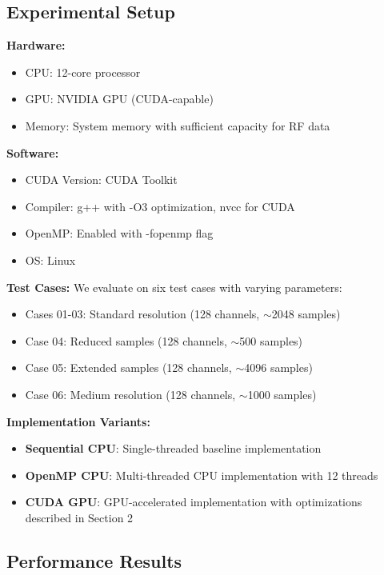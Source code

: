 \documentclass{article}
\begin{document}
\subsection{Experimental Setup}

\textbf{Hardware:}
\begin{itemize}
    \item CPU: 12-core processor
    \item GPU: NVIDIA GPU (CUDA-capable)
    \item Memory: System memory with sufficient capacity for RF data
\end{itemize}

\textbf{Software:}
\begin{itemize}
    \item CUDA Version: CUDA Toolkit
    \item Compiler: g++ with -O3 optimization, nvcc for CUDA
    \item OpenMP: Enabled with -fopenmp flag
    \item OS: Linux
\end{itemize}

\textbf{Test Cases:}
We evaluate on six test cases with varying parameters:
\begin{itemize}
    \item Cases 01-03: Standard resolution (128 channels, $\sim$2048 samples)
    \item Case 04: Reduced samples (128 channels, $\sim$500 samples)
    \item Case 05: Extended samples (128 channels, $\sim$4096 samples)
    \item Case 06: Medium resolution (128 channels, $\sim$1000 samples)
\end{itemize}

\textbf{Implementation Variants:}
\begin{itemize}
    \item \textbf{Sequential CPU}: Single-threaded baseline implementation
    \item \textbf{OpenMP CPU}: Multi-threaded CPU implementation with 12 threads
    \item \textbf{CUDA GPU}: GPU-accelerated implementation with optimizations described in Section 2
\end{itemize}

\subsection{Performance Results}
\end{document}
